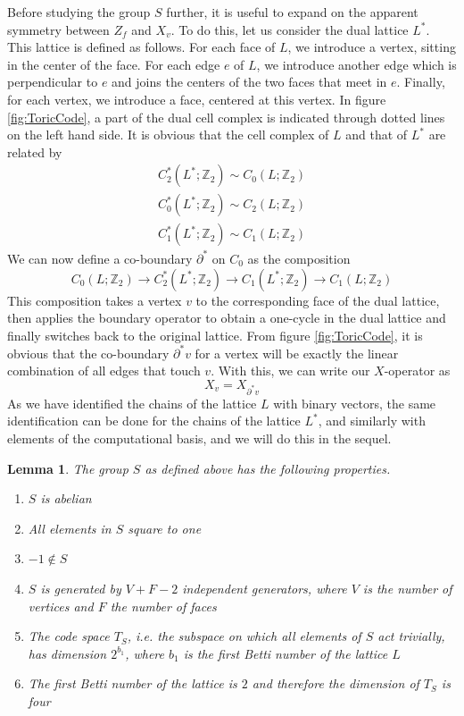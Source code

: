 \documentclass[a4paper, draft]{article}
\theoremstyle{own}
\newtheorem{lem}[thm]{Lemma}
\theoremstyle{remark}
\newcommand{\Z}{\mathbb{Z}}
\begin{document}
Before studying the group $S$ further, it is useful to expand on the apparent symmetry between $Z_f$ and $X_v$. To do this, let us consider the dual lattice $L^*$. This lattice is defined as follows. For each face of $L$, we introduce a vertex, sitting in the center of the face. For each edge $e$ of $L$, we introduce another edge which is perpendicular to $e$ and joins the centers of the two faces that meet in $e$. Finally, for each vertex, we introduce a face, centered at this vertex. In figure \ref{fig:ToricCode}, a part of the dual cell complex is indicated through dotted lines on the left hand side. It is obvious that the cell complex of $L$ and that of $L^*$ are related by
\begin{align*}
C_2^*(L^*;\Z_2) \sim C_0(L;\Z_2) \\
C_0^*(L^*;\Z_2) \sim C_2(L;\Z_2) \\
C_1^*(L^*;\Z_2) \sim C_1(L;\Z_2) 
\end{align*}
We can now define a co-boundary $\partial^*$ on $C_0$ as the composition
$$
C_0(L ; \Z_2) \rightarrow C_2^*(L^*; \Z_2) \rightarrow C_1(L^*;\Z_2) \rightarrow C_1(L;\Z_2)
$$
This composition takes a vertex $v$ to the corresponding face of the dual lattice, then applies the boundary operator to obtain a one-cycle in the dual lattice and finally switches back to the original lattice. From figure \ref{fig:ToricCode}, it is obvious that the co-boundary $\partial^* v$ for a vertex will be exactly the linear combination of all edges that touch $v$. With this, we can write our $X$-operator as
$$
X_v = X_{\partial^* v}
$$
As we have identified the chains of the lattice $L$ with binary vectors, the same identification can be done for the chains of the lattice $L^*$, and similarly with elements of the computational basis, and we will do this in the sequel.

\begin{lem}\label{lem:toriccodedimension}
The group $S$ as defined above has the following properties.
\begin{enumerate}
	\item $S$ is abelian
	\item All elements in $S$ square to one
	\item $-1 \notin S$
	\item $S$ is generated by $V + F - 2$ independent generators, where $V$ is the number of vertices and $F$ the number of faces
	\item The code space $T_S$, i.e. the subspace on which all elements of $S$ act trivially, has dimension $2^{b_1}$, where $b_1$ is the first Betti number of the lattice $L$
	\item The first Betti number of the lattice is $2$ and therefore the dimension of $T_S$ is four
\end{enumerate}
\end{lem}
\end{document}

